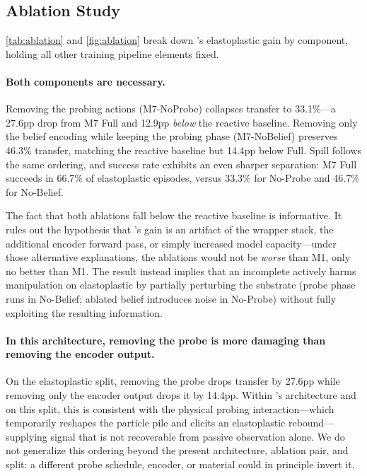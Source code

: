 \subsection{Ablation Study}
\label{sec:results_ablation}

\cref{tab:ablation} and \cref{fig:ablation} break down \PTA{}'s elastoplastic gain by component, holding all other training pipeline elements fixed.

\paragraph{Both components are necessary.}
Removing the probing actions (M7-NoProbe) collapses transfer to 33.1\%---a 27.6pp drop from M7 Full and 12.9pp \emph{below} the reactive baseline. Removing only the belief encoding while keeping the probing phase (M7-NoBelief) preserves 46.3\% transfer, matching the reactive baseline but 14.4pp below \PTA{} Full. Spill follows the same ordering, and success rate exhibits an even sharper separation: M7 Full succeeds in 66.7\% of elastoplastic episodes, versus 33.3\% for No-Probe and 46.7\% for No-Belief.

The fact that both ablations fall below the reactive baseline is informative. It rules out the hypothesis that \PTA{}'s gain is an artifact of the wrapper stack, the additional encoder forward pass, or simply increased model capacity---under those alternative explanations, the ablations would not be \emph{worse} than M1, only no better than M1. The result instead implies that an incomplete \PTA{} actively harms manipulation on elastoplastic by partially perturbing the substrate (probe phase runs in No-Belief; ablated belief introduces noise in No-Probe) without fully exploiting the resulting information.

\paragraph{In this architecture, removing the probe is more damaging than removing the encoder output.}
On the elastoplastic split, removing the probe drops transfer by 27.6pp while removing only the encoder output drops it by 14.4pp. Within \PTA{}'s architecture and on this split, this is consistent with the physical probing interaction---which temporarily reshapes the particle pile and elicits an elastoplastic rebound---supplying signal that is not recoverable from passive observation alone. We do not generalize this ordering beyond the present architecture, ablation pair, and split: a different probe schedule, encoder, or material could in principle invert it.

